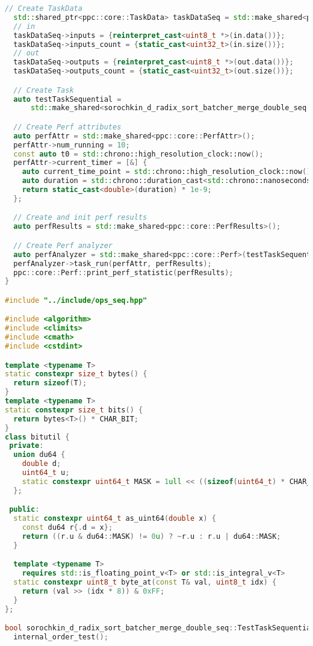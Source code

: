 \documentclass[12pt]{article}
\begin{document}
\begin{lstlisting}[language=C++, caption={Код алгоритма}]
  // Create TaskData
  std::shared_ptr<ppc::core::TaskData> taskDataSeq = std::make_shared<ppc::core::TaskData>();
  // in
  taskDataSeq->inputs = {reinterpret_cast<uint8_t *>(in.data())};
  taskDataSeq->inputs_count = {static_cast<uint32_t>(in.size())};
  // out
  taskDataSeq->outputs = {reinterpret_cast<uint8_t *>(out.data())};
  taskDataSeq->outputs_count = {static_cast<uint32_t>(out.size())};

  // Create Task
  auto testTaskSequential =
      std::make_shared<sorochkin_d_radix_sort_batcher_merge_double_seq::TestTaskSequential>(taskDataSeq);

  // Create Perf attributes
  auto perfAttr = std::make_shared<ppc::core::PerfAttr>();
  perfAttr->num_running = 10;
  const auto t0 = std::chrono::high_resolution_clock::now();
  perfAttr->current_timer = [&] {
    auto current_time_point = std::chrono::high_resolution_clock::now();
    auto duration = std::chrono::duration_cast<std::chrono::nanoseconds>(current_time_point - t0).count();
    return static_cast<double>(duration) * 1e-9;
  };

  // Create and init perf results
  auto perfResults = std::make_shared<ppc::core::PerfResults>();

  // Create Perf analyzer
  auto perfAnalyzer = std::make_shared<ppc::core::Perf>(testTaskSequential);
  perfAnalyzer->task_run(perfAttr, perfResults);
  ppc::core::Perf::print_perf_statistic(perfResults);
}

#include "../include/ops_seq.hpp"

#include <algorithm>
#include <climits>
#include <cmath>
#include <cstdint>

template <typename T>
static constexpr size_t bytes() {
  return sizeof(T);
}
template <typename T>
static constexpr size_t bits() {
  return bytes<T>() * CHAR_BIT;
}
class bitutil {
 private:
  union du64 {
    double d;
    uint64_t u;
    static constexpr uint64_t MASK = 1ull << ((sizeof(uint64_t) * CHAR_BIT) - 1);
  };

 public:
  static constexpr uint64_t as_uint64(double x) {
    const du64 r{.d = x};
    return ((r.u & du64::MASK) != 0u) ? ~r.u : r.u | du64::MASK;
  }

  template <typename T>
    requires std::is_floating_point_v<T> or std::is_integral_v<T>
  static constexpr uint8_t byte_at(const T& val, uint8_t idx) {
    return (val >> (idx * 8)) & 0xFF;
  }
};

bool sorochkin_d_radix_sort_batcher_merge_double_seq::TestTaskSequential::pre_processing() {
  internal_order_test();


\end{lstlisting}
\end{document}

